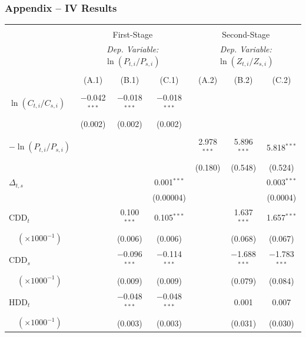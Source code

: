 \documentclass[aspectratio=169]{beamer}
\begin{document}
	
	\begin{frame}
		\frametitle{Appendix -- IV Results}
		
		\begin{table}[h] \centering 
			\label{table:2} 
			\tiny
			\begin{tabular}{@{\extracolsep{4pt}}lcccccc} 
				\\[-4ex]\hline  
				\hline \\[-1.6ex] 
				& \multicolumn{3}{c}{First-Stage} & \multicolumn{3}{c}{Second-Stage} \\ [0.5ex]
				& \multicolumn{3}{c}{\textit{Dep. Variable:} $\ln (P_{t,i} / P_{s,i})$ } & \multicolumn{3}{c}{\textit{Dep. Variable:}  $\ln (Z_{ t, i} / Z_{ s, i})$}\\ [0.5ex]
				\cmidrule(lr){2-4} \cmidrule(lr){5-7}\\[-2.9ex] 
				& (A.1) & (B.1) & (C.1) & (A.2) & (B.2) & (C.2)\\ [0.5ex]
				\hline \\[-1.8ex] 
				$ \ln (C_{t,i} / C_{s,i})$ & $-$0.042$^{***}$ & $-$0.018$^{***}$ & $-$0.018$^{***}$ &  &  &  \\ 
				& (0.002) & (0.002) & (0.002) &  &  &  \\ 
				& & & & & & \\[-1ex]
				$-\ln (P_{t,i} / P_{s,i})$ &  &  &  & 2.978$^{***}$ & 5.896$^{***}$ & 5.818$^{***}$ \\ 
				&  &  &  & (0.180) & (0.548) & (0.524) \\   
				$\Delta_{t,s}$  &  &  & 0.001$^{***}$ &  &  & 0.003$^{***}$ \\ 
				&  &  & (0.00004) &  &  & (0.0004) \\ 
				CDD$_t$  &  & 0.100$^{***}$ & 0.105$^{***}$ &  & 1.637$^{***}$ & 1.657$^{***}$ \\ 
				$\quad(\times 1000^{-1})$ &  & (0.006) & (0.006) &  & (0.068) & (0.067) \\ 
				CDD$_s$ &  & $-$0.096$^{***}$ & $-$0.114$^{***}$ &  & $-$1.688$^{***}$ & $-$1.783$^{***}$ \\ 
				$\quad(\times 1000^{-1})$  &  & (0.009) & (0.009) &  & (0.079) & (0.084) \\ 
				HDD$_t$  &  & $-$0.048$^{***}$ & $-$0.048$^{***}$ &  & 0.001 & 0.007 \\ 
				$\quad(\times 1000^{-1})$ &  & (0.003) & (0.003) &  & (0.031) & (0.030) \\ 

\end{tabular}
\end{table}
\end{frame}
\end{document}

